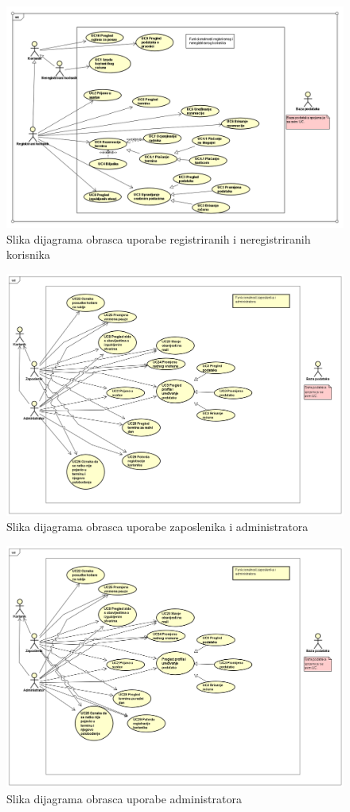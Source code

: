 \begin{figure}[H]
	\includegraphics[width=.9\linewidth]{slike/DOU1.PNG}
	\centering
	\caption{Slika dijagrama obrasca uporabe registriranih i neregistriranih korisnika}
	\label{fig:dou1}
\end{figure}

\begin{figure}[H]
	\includegraphics[width=.9\linewidth]{slike/DOU2.PNG}
	\centering
	\caption{Slika dijagrama obrasca uporabe zaposlenika i administratora}
	\label{fig:dou2}
\end{figure}

\begin{figure}[H]
	\includegraphics[width=.9\linewidth]{slike/DOU3.PNG}
	\centering
	\caption{Slika dijagrama obrasca uporabe administratora}
	\label{fig:dou3}
\end{figure}

